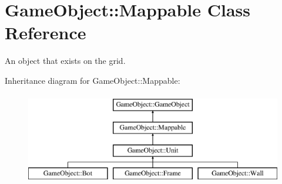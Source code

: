 \hypertarget{classGameObject_1_1Mappable}{
\section{GameObject::Mappable Class Reference}
\label{classGameObject_1_1Mappable}
}


An object that exists on the grid.  


Inheritance diagram for GameObject::Mappable:\begin{figure}[H]
\begin{center}
\leavevmode
\includegraphics[height=4cm]{classGameObject_1_1Mappable}
\end{center}
\end{figure}
